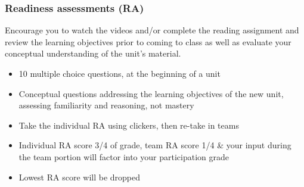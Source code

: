 \documentclass[slidestop,compress,mathserif,12pt,t,professionalfonts,xcolor=table]{beamer}
\begin{document}

\begin{frame}
\frametitle{Readiness assessments (RA)}

 Encourage you to watch the videos and/or complete the reading 
assignment and review the learning objectives prior to coming to class as well as 
evaluate your conceptual understanding of the unit's material.

\begin{itemize}

\item 10 multiple choice questions, at the beginning of a unit

\item Conceptual questions addressing the learning objectives of the new unit, 
assessing familiarity and reasoning, not mastery

\item Take the individual RA using clickers, then re-take in teams

\item Individual RA score 3/4 of grade, team RA score 1/4 \& your input during the 
team portion will factor into your participation grade

\item Lowest RA score will be dropped

\end{itemize}


\end{frame}

\end{document}
